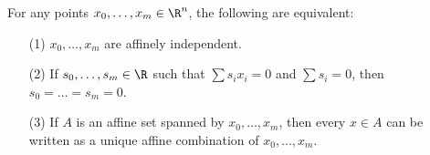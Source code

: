 \begin{theorem}\label{3.1.4}
    For any points $x_0, \dots, x_m \in \R^n$, the following are equivalent:
    \begin{enumerate}
        \item[(1)] $x_0, \dots, x_m$ are affinely independent.

        \item[(2)] If $s_0, \dots, s_m \in \R$ such that $\sum{s_ix_i}=0$ and
            $\sum{s_i}=0$, then $s_0=\dots=s_m=0$.

        \item[(3)] If $A$ is an affine set spanned by  $x_0, \dots, x_m$, then
            every $x \in A$ can be written as a unique affine combination of
            $x_0, \dots, x_m$.
    \end{enumerate}
\end{theorem}
